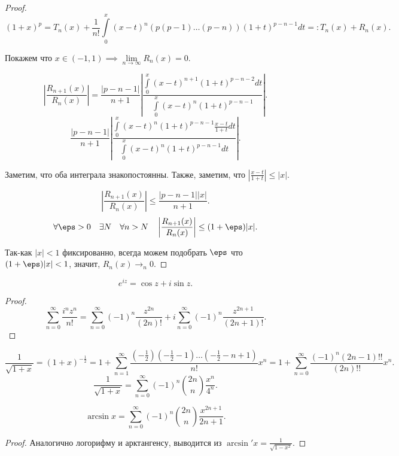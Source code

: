 \begin{theorem}
\begin{proof}
        \[ (1+x)^{p} = T_{n}(x) + \frac{1}{n!}\int\limits_{0}^{x} (x-t)^{n} (p(p-1)\ldots (p-n))(1+t)^{p-n-1}dt =: T_{n}(x) + R_{n}(x)  .\]

        Покажем что $x\in (-1, 1) \implies \lim\limits_{n \to \infty} R_{n}(x) = 0$.

        \[ \left| \frac{R_{n+1}(x)}{R_{n}(x)}\right| = \frac{ |p-n-1| }{n+1} \left| \frac{\int\limits_{0}^{x} (x-t)^{n+1}(1+t)^{p-n-2}dt }{\int\limits_{0}^{x} (x-t)^{n}(1+t)^{p-n-1} }\right|  .\]
        \[ \frac{ |p-n-1| }{n+1} \left| \frac{\int\limits_{0}^{x} (x-t)^{n}(1+t)^{p-n-1} \frac{x-t}{1+t}dt }{\int\limits_{0}^{x} (x-t)^{n}(1+t)^{p-n-1}dt }\right| .\]

        Заметим, что оба интеграла знакопостоянны. Также, заметим, что $\left|\frac{x-t}{1+t}\right| \le |x|$.

    \[ \left| \frac{R_{n+1}(x)}{R_{n}(x)}\right| \le \frac{ |p-n-1| |x| }{n+1} .\]
    \[ \forall{\eps > 0}\quad \exists{N}\quad \forall{n > N}\quad \left| \frac{R_{n+1}(x)}{R_{n}(x)}\right| \le (1+\eps)|x| .\]

    Так-как $|x| < 1$ фиксированно, всегда можем подобрать $\eps$ что $(1+\eps)|x| < 1$, значит, $R_{n}(x) \to_{n} 0$. 
    \end{proof}
\end{theorem}
\begin{consequence} \thmslashn

    \[ e^{iz} = \cos z + i\sin z .\]
    \begin{proof} \thmslashn
    
        \[ \sum\limits_{n=0}^{\infty} \frac{i^{n}z^{n}}{n!} = \sum\limits_{n=0}^{\infty} (-1)^{n}\frac{z^{2n}}{(2n)!} + i \sum\limits_{n=0}^{\infty} (-1)^{n} \frac{z^{2n+1}}{(2n+1)!} .\] 
    \end{proof}
\end{consequence}
\begin{consequence} \thmslashn

    \[ \frac{1}{\sqrt{1+x} } = (1+x)^{-\frac{1}{2}} = 1 + \sum\limits_{n=1}^{\infty} \frac{\left( -\frac{1}{2} \right)\left( -\frac{1}{2} - 1 \right)\ldots\left( -\frac{1}{2}-n+1 \right)}{n!}x^{n} = 1 + \sum\limits_{n=0}^{\infty} \frac{(-1)^{n}(2n-1)!!}{(2n)!!}x^{n}  .\]
    \[ \frac{1}{\sqrt{1+x} } = \sum\limits_{n=0}^{\infty} (-1)^{n}\binom{2n}{n} \frac{x^{n}}{4^{n}} .\] 
\end{consequence}
\begin{lemma} \thmslashn

    \[ \arcsin x = \sum\limits_{n=0}^{\infty} (-1)^{n}\binom{2n}{n}\frac{x^{2n+1}}{2n+1} .\] 
    \begin{proof} \thmslashn
    
        Аналогично логорифму и арктангенсу, выводится из $\arcsin' x = \frac{1}{\sqrt{1-x^2} }$.
    \end{proof}
\end{lemma}
